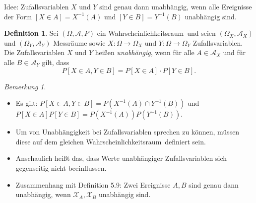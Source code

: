 \documentclass[a4paper,12pt,fleqn]{scrartcl}
\newcommand{\m}[1]{\mathcal{ #1 }}
\newcommand{\WR}{Wahrscheinlichkeitsraum}
\newcommand{\ZV}{Zufallsvariable}
\theoremstyle{definition}
\newtheorem{definition}{Definition}[section]
\theoremstyle{plain}
\theoremstyle{remark}
\newtheorem*{bemerkung}{Bemerkung}
\begin{document}
Idee: \ZV n $X$ und $Y$ sind genau dann unabhängig, wenn alle Ereignisse der Form  $[X \in A] = X^{-1}(A) $ und $[Y \in B] = Y^{-1}(B)$ unabhängig sind.
\begin{definition}
Sei $( \Omega , \m{A} , P)$ ein \WR \, und seien $ ( \Omega_X , \m{A}_X )$ und $(\Omega_Y , \m{A}_Y ) $ Messräume sowie $X: \Omega \rightarrow \Omega_X$ und $Y: \Omega \rightarrow \Omega_Y$ \ZV n. Die \ZV n $X$ und $Y$ heißen \emph{unabhängig}, wenn für alle $A \in \m{A}_X$ und für alle $B \in \m{A}_Y$ gilt, dass
\[P[X \in A, Y \in B]= P[X \in A] \cdot P[Y \in B].\]
\end{definition}
\begin{bemerkung}
\begin{itemize}
\item Es gilt: $ P[X \in A , Y \in B] = P(X^{-1}(A) \cap Y^{-1}(B)) $ und $ P[X \in A]P[ Y \in B ] = P(X^{-1}(A))P(Y^{-1}(B)) $.
\item Um von Unabhängigkeit bei Zufallsvariablen sprechen zu können, müssen diese auf dem gleichen \WR \, definiert sein.
\item Anschaulich heißt das, dass Werte unabhängiger Zufallsvariablen sich gegenseitig nicht beeinflussen.
\item Zusammenhang mit Definition 5.9: Zwei Ereignisse $A, B$ sind genau dann unabhängig, wenn $\m{X}_A, \m{X}_B$ unabhängig sind. 
\end{itemize}
\end{bemerkung}
\end{document}

